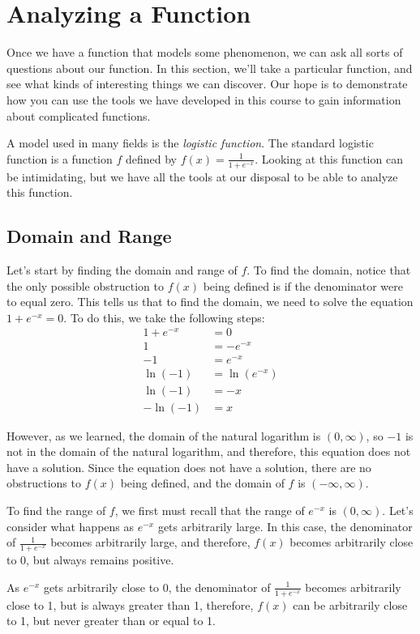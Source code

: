 \documentclass{ximera}
\begin{document}
\section{Analyzing a Function}
Once we have a function that models some phenomenon, we can ask all sorts of questions about our function. In this section, we'll take a particular function, and see what kinds of interesting things we can discover. Our hope is to demonstrate how you can use the tools we have developed in this course to gain information about complicated functions. 

A model used in many fields is the \emph{logistic function}. The standard logistic function is a function $f$ defined by $f(x) = \frac{1}{1 + e^{-x}}$. Looking at this function can be intimidating, but we have all the tools at our disposal to be able to analyze this function. 

\subsection{Domain and Range}
Let's start by finding the domain and range of $f$. To find the domain, notice that the only possible obstruction to $f(x)$ being defined is if the denominator were to equal zero. This tells us that to find the domain, we need to solve the equation $1 + e^{-x} = 0$. To do this, we take the following steps:
\begin{align*}
1 + e^{-x} & = 0 \\
1 & = -e^{-x} \\
-1 & = e^{-x} \\
\ln(-1) & = \ln(e^{-x}) \\
\ln(-1) & = -x \\
-\ln(-1) & = x
\end{align*}

However, as we learned, the domain of the natural logarithm is $(0, \infty)$, so $-1$ is not in the domain of the natural logarithm, and therefore, this equation does not have a solution. Since the equation does not have a solution, there are no obstructions to $f(x)$ being defined, and the domain of $f$ is $(-\infty, \infty)$.

To find the range of $f$, we first must recall that the range of $e^{-x}$ is $(0, \infty)$. Let's consider what happens as $e^{-x}$ gets arbitrarily large. In this case, the denominator of $\frac{1}{1 + e^{-x}}$ becomes arbitrarily large, and therefore, $f(x)$ becomes arbitrarily close to 0, but always remains positive. 

As $e^{-x}$ gets arbitrarily close to 0, the denominator of $\frac{1}{1 + e^{-x}}$ becomes arbitrarily close to 1, but is always greater than 1, therefore, $f(x)$ can be arbitrarily close to 1, but never greater than or equal to 1. 
\end{document}
